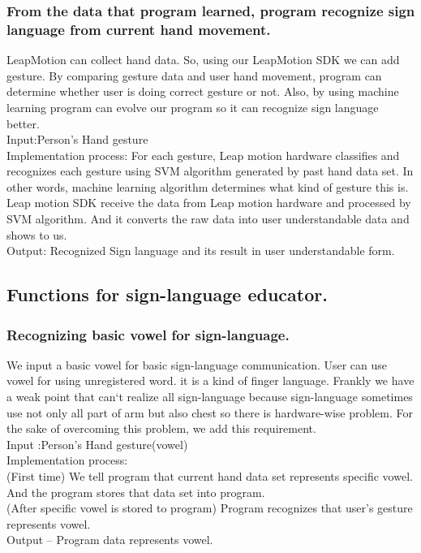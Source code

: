 \documentclass[10pt,journal,compsoc]{IEEEtran}
\begin{document}
\subsubsection {From the data that program learned, program recognize sign language from current hand movement.\\}
LeapMotion can collect hand data. So, using our LeapMotion SDK we can add gesture. By comparing gesture data and user hand movement, program can determine whether user is doing correct gesture or not. Also, by using machine learning program can evolve our program so it can recognize sign language better.
\\Input:Person's Hand gesture
\\Implementation process: For each gesture, Leap motion hardware classifies and recognizes each gesture using SVM algorithm generated by past hand data set. In other words, machine learning algorithm determines what kind of gesture this is. Leap motion SDK receive the data from Leap motion hardware and processed by SVM algorithm. And it converts the raw data into user understandable data and shows to us.
\\Output: Recognized Sign language and its result in user understandable form.

\subsection{Functions for sign-language educator.\\}

\subsubsection {Recognizing basic vowel for sign-language.\\}

We input a basic vowel for basic sign-language communication. User can use vowel for using unregistered word. it is a kind of finger language. Frankly we have a weak point that can`t realize all sign-language because sign-language sometimes use not only all part of arm but also chest so there is hardware-wise problem. For the sake of overcoming this problem, we add this requirement.
\\Input :Person's Hand gesture(vowel)
\\Implementation process:
\\(First time) We tell program that current hand data set represents specific vowel. And the program stores that data set into program.
\\(After specific vowel is stored to program) Program recognizes that user’s gesture represents vowel.
\\Output – Program data represents vowel.
\end{document}

